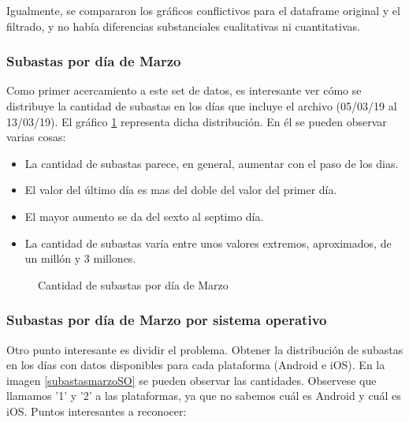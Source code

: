 \documentclass[a4paper, 12pt]{article}
\newcommand\tab[1][1cm]{\hspace*{#1}}
\begin{document}
	\tab Igualmente, se compararon los gráficos conflictivos para el dataframe original y el filtrado, y no había diferencias substanciales cualitativas ni cuantitativas.
	
	
	\subsubsection{Subastas por día de Marzo}
	\tab Como primer acercamiento a este set de datos, es interesante ver cómo se distribuye la cantidad de subastas en los días que incluye el archivo (05/03/19 al 13/03/19). El gráfico \ref{subastasmarzo} representa dicha distribución. En él se pueden observar varias cosas:
	\begin{itemize}
		\item La cantidad de subastas parece, en general, aumentar con el paso de los dias.
		\item El valor del último día es mas del doble del valor del primer día.
		\item El mayor aumento se da del sexto al septimo día.
		\item La cantidad de subastas varía entre unos valores extremos, aproximados, de un millón y 3 millones.
	\end{itemize}

	\FloatBarrier
		\begin{figure}
			\centering
		   		\caption{Cantidad de subastas por día de Marzo}
			   	\label{subastasmarzo}
		\end{figure}
	\FloatBarrier

	\subsubsection{Subastas por día de Marzo por sistema operativo}
	\tab Otro punto interesante es dividir el problema. Obtener la distribución de subastas en los días con datos disponibles para cada plataforma (Android e iOS). En la imagen \ref{subastasmarzoSO} se pueden observar las cantidades. Observese que llamamos '1' y '2' a las plataformas, ya que no sabemos cuál es Android y cuál es iOS.
	\tab Puntos interesantes a reconocer:
\end{document}
